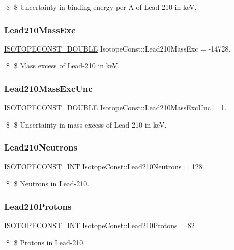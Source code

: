 \$ \$ Uncertainty in binding energy per A of Lead-\/210 in keV. \mbox{\label{group___isotope_const-_lead-_pb210_ga12aca40b8e08649ab20a75fdffa0c2f1}} 
\subsubsection{\texorpdfstring{Lead210\+Mass\+Exc}{Lead210MassExc}}
{\footnotesize\ttfamily \mbox{\hyperlink{group___isotope_const-_macros_ga8f45a7272ce02c0b4c65c44636ed719a}{I\+S\+O\+T\+O\+P\+E\+C\+O\+N\+S\+T\+\_\+\+D\+O\+U\+B\+LE}} Isotope\+Const\+::\+Lead210\+Mass\+Exc = -\/14728.}

\$ \$ Mass excess of Lead-\/210 in keV. \mbox{\label{group___isotope_const-_lead-_pb210_ga05e453cb2a70d377b739bedb4f37980f}} 
\subsubsection{\texorpdfstring{Lead210\+Mass\+Exc\+Unc}{Lead210MassExcUnc}}
{\footnotesize\ttfamily \mbox{\hyperlink{group___isotope_const-_macros_ga8f45a7272ce02c0b4c65c44636ed719a}{I\+S\+O\+T\+O\+P\+E\+C\+O\+N\+S\+T\+\_\+\+D\+O\+U\+B\+LE}} Isotope\+Const\+::\+Lead210\+Mass\+Exc\+Unc = 1.}

\$ \$ Uncertainty in mass excess of Lead-\/210 in keV. \mbox{\label{group___isotope_const-_lead-_pb210_ga12d400daee812fa41f0bb924b3be6141}} 
\subsubsection{\texorpdfstring{Lead210\+Neutrons}{Lead210Neutrons}}
{\footnotesize\ttfamily \mbox{\hyperlink{group___isotope_const-_macros_ga5f18360b3e99483a35c32d789e62621c}{I\+S\+O\+T\+O\+P\+E\+C\+O\+N\+S\+T\+\_\+\+I\+NT}} Isotope\+Const\+::\+Lead210\+Neutrons = 128}

\$ \$ Neutrons in Lead-\/210. \mbox{\label{group___isotope_const-_lead-_pb210_ga41f1fe8422b0128308be360c5e98758f}} 
\subsubsection{\texorpdfstring{Lead210\+Protons}{Lead210Protons}}
{\footnotesize\ttfamily \mbox{\hyperlink{group___isotope_const-_macros_ga5f18360b3e99483a35c32d789e62621c}{I\+S\+O\+T\+O\+P\+E\+C\+O\+N\+S\+T\+\_\+\+I\+NT}} Isotope\+Const\+::\+Lead210\+Protons = 82}

\$ \$ Protons in Lead-\/210. 